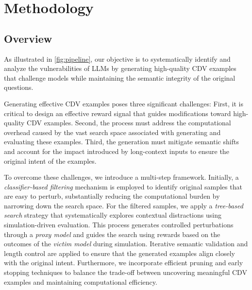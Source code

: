 \section{Methodology}
\subsection{Overview}


As illustrated in \autoref{fig:pipeline}, our objective is to systematically identify and analyze the vulnerabilities of LLMs by generating high-quality CDV examples that challenge models while maintaining the semantic integrity of the original questions.

Generating effective CDV examples poses three significant challenges: First, it is critical to design an effective reward signal that guides modifications toward high-quality CDV examples. Second, the process must address the computational overhead caused by the vast search space associated with generating and evaluating these examples. Third, the generation must mitigate semantic shifts and account for the impact introduced by long-context inputs to ensure the original intent of the examples.

To overcome these challenges, we introduce a multi-step framework. Initially, a \emph{classifier-based filtering} mechanism is employed to identify  original samples that are easy to perturb, substantially reducing the computational burden by narrowing down the search space. For the filtered samples, we apply a \emph{tree-based search} strategy that systematically explores contextual distractions using simulation-driven evaluation. This process generates controlled perturbations through a \emph{proxy model} and guides the search using rewards based on the outcomes of the \emph{victim model} during simulation. Iterative semantic validation and length control are applied to ensure that the generated examples align closely with the original intent. Furthermore, we incorporate efficient pruning and early stopping techniques to balance the trade-off between uncovering meaningful CDV examples and maintaining computational efficiency.



